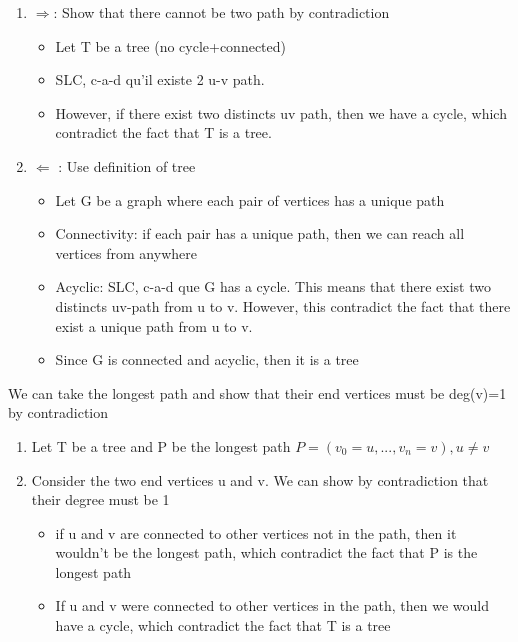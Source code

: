 \documentclass{article}
\begin{document}
\begin{theorem}
    \begin{enumerate}
        \item $\Longrightarrow$: Show that there cannot be two path by
	    contradiction
	    \begin{itemize}
		\item Let T be a tree (no cycle+connected)
		\item SLC, c-a-d qu'il existe 2 u-v path.
		\item However, if there exist two distincts uv path, then
		    we have a cycle, which contradict the fact that T is
		    a tree.
	    \end{itemize}
        \item $\Longleftarrow$ : Use definition of tree
	    \begin{itemize}
	        \item Let G be a graph where each pair of vertices has a
		    unique path
		\item Connectivity: if each pair has a unique path, then
		    we can reach all vertices from anywhere
		\item Acyclic: SLC, c-a-d que G has a cycle. This means
		    that there exist two distincts uv-path from u to v.
		    However, this contradict the fact that there exist
		    a unique path from u to v.
		\item Since G is connected and acyclic, then it is a tree
	    \end{itemize}
    \end{enumerate}
\end{theorem}

\begin{theorem}
    We can take the longest path and show that their end vertices must
    be deg(v)=1 by contradiction
    \begin{enumerate}
	\item Let T be a tree and P be the longest path $P=(v_0=u, ...,
	    v_n=v), u \neq v$
	\item Consider the two end vertices u and v. We can show by
	    contradiction that their degree must be 1
	    \begin{itemize}
	        \item if u and v are connected to other vertices not in
		    the path, then it wouldn't be the longest path, which
		    contradict the fact that P is the longest path
		\item If u and v were connected to other vertices in the
		    path, then we would have a cycle, which contradict the
		    fact that T is a tree
	    \end{itemize}
    \end{enumerate}
\end{theorem}
\end{document}
